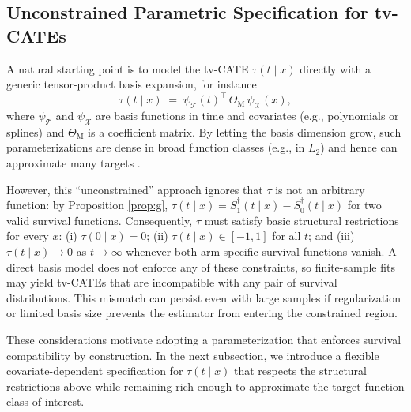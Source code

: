\documentclass{article}
\begin{document}
\subsection{Unconstrained Parametric Specification for tv-CATEs}
A natural starting point is to model the tv-CATE $\tau(t\mid x)$ directly with a generic tensor-product basis expansion, for instance
\[
\tau(t\mid x)
\;=\;
\psi_{\mathcal T}(t)^{\top}\,\Theta_{\text{M}}\,\psi_{\mathcal X}(x),
\]
where $\psi_{\mathcal T}$ and $\psi_{\mathcal X}$ are basis functions in time and covariates (e.g., polynomials or splines) and $\Theta_{\text{M}}$ is a coefficient matrix.
By letting the basis dimension grow, such parameterizations are dense in broad function classes (e.g., in $L_2$) and hence can approximate many targets \citep{chen2007large}.

However, this ``unconstrained'' approach ignores that $\tau$ is not an arbitrary function: by Proposition \ref{prop:g},
\(
\tau(t\mid x)=S_1^{\dag}(t\mid x)-S_0^{\dag}(t\mid x)
\)
for two valid survival functions.
Consequently, $\tau$ must satisfy basic structural restrictions for every $x$:
(i) $\tau(0\mid x)=0$;
(ii) $\tau(t\mid x)\in[-1,1]$ for all $t$;
and (iii) $\tau(t\mid x)\to 0$ as $t\to\infty$ whenever both arm-specific survival functions vanish.
A direct basis model does not enforce any of these constraints, so finite-sample fits may yield tv-CATEs that are incompatible with any pair of survival distributions. This mismatch can persist even with large samples if regularization or limited basis size prevents the estimator from entering the constrained region.

These considerations motivate adopting a parameterization that enforces survival compatibility by construction. In the next subsection, we introduce a flexible covariate-dependent specification for $\tau(t\mid x)$ that respects the structural restrictions above while remaining rich enough to approximate the target function class of interest.
\end{document}
